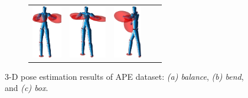 \begin{figure}
\begin{subfigure}[b]{1\linewidth}
\begin{tabular}{ccccc}
			\includegraphics[height=2.3cm]{fig/body/APE/boxx2.png} &
			\includegraphics[height=2.3cm]{fig/body/APE/boxx3.png} & 
			\includegraphics[height=2.3cm]{fig/body/APE/boxx4.png} 
		\end{tabular}
		\label{fig/body/APE/boxx} 
	\end{subfigure}
	\caption{3-D pose estimation results of APE dataset: \emph{(a) balance}, \emph{(b) bend}, and \emph{(c) box}.}
	\label{fig/body/APE1}
\end{figure}

